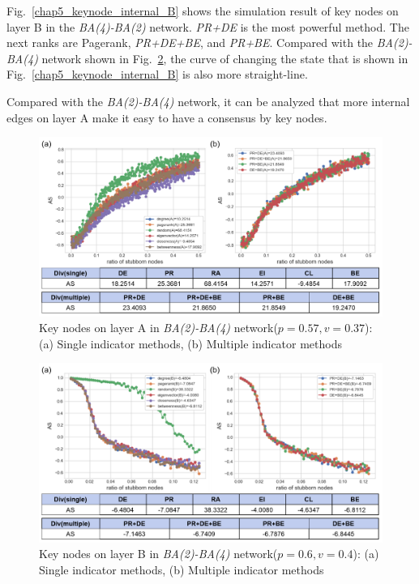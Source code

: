 Fig.~\ref{chap5_keynode_internal_B} shows the simulation result of key nodes on layer B in the \textit{BA(4)-BA(2)} network. \textit{PR+DE} is the most powerful method. The next ranks are Pagerank, \textit{PR+DE+BE}, and \textit{PR+BE}. Compared with the \textit{BA(2)-BA(4)} network shown in Fig.~\ref{chap5_keynode_internal_B2}, the curve of changing the state that is shown in Fig.~\ref{chap5_keynode_internal_B} is also more straight-line. 

Compared with the \textit{BA(2)-BA(4)} network, it can be analyzed that more internal edges on layer A make it easy to have a consensus by key nodes. 

\begin{figure}[!htb]
	\centering
	\includegraphics[width=\hsize]{figure/chap5_keynode_internal_A2.png}
	\caption{Key nodes on layer A in \textit{BA(2)-BA(4)} network($p=0.57, v=0.37$):
		(a) Single indicator methods, (b) Multiple indicator methods}
	\label{chap5_keynode_internal_A2}
\end{figure}
\begin{figure}[!htb]
	\centering
	\includegraphics[width=\hsize]{figure/chap5_keynode_internal_B2.png}
	\caption{Key nodes on layer B in \textit{BA(2)-BA(4)} network($p=0.6, v=0.4$):
		(a) Single indicator methods, (b) Multiple indicator methods}
	\label{chap5_keynode_internal_B2}
\end{figure}

